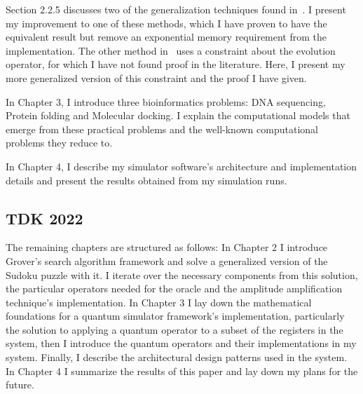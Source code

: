Section 2.2.5 discusses two of the generalization techniques found in~\cite{Portugal}. I present my improvement to one of these methods, which I have proven to have the equivalent result but remove an exponential memory requirement from the implementation. The other method in~\cite{Portugal} uses a constraint about the evolution operator, for which I have not found proof in the literature. Here, I present my more generalized version of this constraint and the proof I have given.

In Chapter 3, I introduce three bioinformatics problems: DNA sequencing, Protein folding and Molecular docking. I explain the computational models that emerge from these practical problems and the well-known computational problems they reduce to.

In Chapter 4, I describe my simulator software's architecture and implementation details and present the results obtained from my simulation runs.

\subsection{TDK 2022}

The remaining chapters are structured as follows: In Chapter 2 I introduce Grover's search algorithm framework and solve a generalized version of the Sudoku puzzle with it. I iterate over the necessary components from this solution, the particular operators needed for the oracle and the amplitude amplification technique's implementation. In Chapter 3 I lay down the mathematical foundations for a quantum simulator framework's implementation, particularly the solution to applying a quantum operator to a subset of the registers in the system, then I introduce the quantum operators and their implementations in my system. Finally, I describe the architectural design patterns used in the system. In Chapter 4 I summarize the results of this paper and lay down my plans for the future.